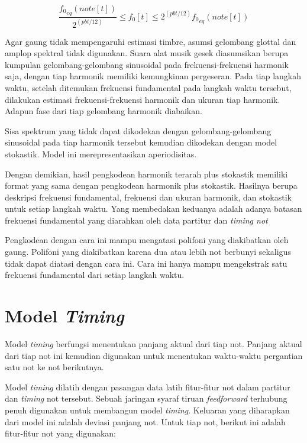 \begin{equation}
    \dfrac{{f_0}_{eq}(note[t])}{2^{(pbt/12)}} \leq f_0[t] \leq 2^{(pbt/12)}{f_0}_{eq}(note[t])
\end{equation}\label{eq-f0-bounds}

Agar gaung tidak mempengaruhi estimasi timbre, asumsi gelombang glottal dan amplop spektral tidak digunakan. Suara alat musik gesek diasumsikan berupa kumpulan gelombang-gelombang sinusoidal pada frekuensi-frekuensi harmonik saja, dengan tiap harmonik memiliki kemungkinan pergeseran. Pada tiap langkah waktu, setelah ditemukan frekuensi fundamental pada langkah waktu tersebut, dilakukan estimasi frekuensi-frekuensi harmonik dan ukuran tiap harmonik. Adapun fase dari tiap gelombang harmonik diabaikan.

Sisa spektrum yang tidak dapat dikodekan dengan gelombang-gelombang sinusoidal pada tiap harmonik tersebut kemudian dikodekan dengan model stokastik. Model ini merepresentasikan aperiodisitas.

Dengan demikian, hasil pengkodean harmonik terarah plus stokastik memiliki format yang sama dengan pengkodean harmonik plus stokastik. Hasilnya berupa deskripsi frekuensi fundamental, frekuensi dan ukuran harmonik, dan stokastik untuk setiap langkah waktu. Yang membedakan keduanya adalah adanya batasan frekuensi fundamental yang diarahkan oleh data partitur dan \textit{timing not}

Pengkodean dengan cara ini mampu mengatasi polifoni yang diakibatkan oleh gaung. Polifoni yang diakibatkan karena dua atau lebih not berbunyi sekaligus tidak dapat diatasi dengan cara ini. Cara ini hanya mampu mengekstrak satu frekuensi fundamental dari setiap langkah waktu.

\section{Model \textit{Timing}}

Model \textit{timing} berfungsi menentukan panjang aktual dari tiap not. Panjang aktual dari tiap not ini kemudian digunakan untuk menentukan waktu-waktu pergantian satu not ke not berikutnya.

Model \textit{timing} dilatih dengan pasangan data latih fitur-fitur not dalam partitur dan \textit{timing} not tersebut. Sebuah jaringan syaraf tiruan \textit{feedforward} terhubung penuh digunakan untuk membangun model \textit{timing}. Keluaran yang diharapkan dari model ini adalah deviasi panjang not. Untuk tiap not, berikut ini adalah fitur-fitur not yang digunakan:

